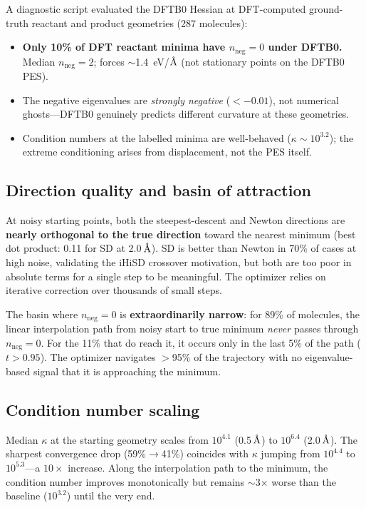 \documentclass[11pt,a4paper]{article}
\newcommand{\angstrom}{\text{\r{A}}}
\begin{document}
A diagnostic script evaluated the DFTB0 Hessian at DFT-computed ground-truth reactant and product geometries (287 molecules):

\begin{itemize}[nosep]
  \item \textbf{Only 10\% of DFT reactant minima have $n_\text{neg} = 0$ under DFTB0.} Median $n_\text{neg} = 2$; forces $\sim$1.4~eV/$\angstrom$ (not stationary points on the DFTB0 PES).
  \item The negative eigenvalues are \emph{strongly negative} ($< -0.01$), not numerical ghosts---DFTB0 genuinely predicts different curvature at these geometries.
  \item Condition numbers at the labelled minima are well-behaved ($\kappa \sim 10^{3.2}$); the extreme conditioning arises from displacement, not the PES itself.
\end{itemize}

\subsection*{Direction quality and basin of attraction}

At noisy starting points, both the steepest-descent and Newton directions are \textbf{nearly orthogonal to the true direction} toward the nearest minimum (best dot product: 0.11 for SD at 2.0\,$\angstrom$). SD is better than Newton in 70\% of cases at high noise, validating the iHiSD crossover motivation, but both are too poor in absolute terms for a single step to be meaningful. The optimizer relies on iterative correction over thousands of small steps.

The basin where $n_\text{neg} = 0$ is \textbf{extraordinarily narrow}: for 89\% of molecules, the linear interpolation path from noisy start to true minimum \emph{never} passes through $n_\text{neg} = 0$. For the 11\% that do reach it, it occurs only in the last 5\% of the path ($t > 0.95$). The optimizer navigates $>$95\% of the trajectory with no eigenvalue-based signal that it is approaching the minimum.

\subsection*{Condition number scaling}

Median $\kappa$ at the starting geometry scales from $10^{4.1}$ (0.5\,$\angstrom$) to $10^{6.4}$ (2.0\,$\angstrom$). The sharpest convergence drop (59\%$\to$41\%) coincides with $\kappa$ jumping from $10^{4.4}$ to $10^{5.3}$---a $10\times$ increase. Along the interpolation path to the minimum, the condition number improves monotonically but remains $\sim$3$\times$ worse than the baseline ($10^{3.2}$) until the very end.
\end{document}
